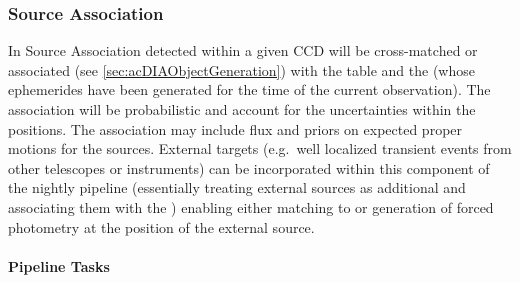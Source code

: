 \begin{itemize}
\end{itemize}

\subsubsection{Source Association}
\label{sec:apSourceAssoc}

In Source Association \DIASources detected within a given CCD will be cross-matched or associated (see \ref{sec:acDIAObjectGeneration}) with the \DIAObject table and the \SSObjects (whose ephemerides have been generated for the time of the current observation). The association will be probabilistic  and account for the uncertainties within the positions. The association may include flux and priors on expected proper motions for the sources. External targets (e.g.\ well localized transient events from other telescopes or instruments) can be incorporated within this component of the nightly pipeline (essentially treating external sources as additional \DIAObjects and associating them with the \DIASources) enabling either matching to \DIASources or generation of forced photometry at the position of the external source.

\paragraph{Pipeline Tasks}

